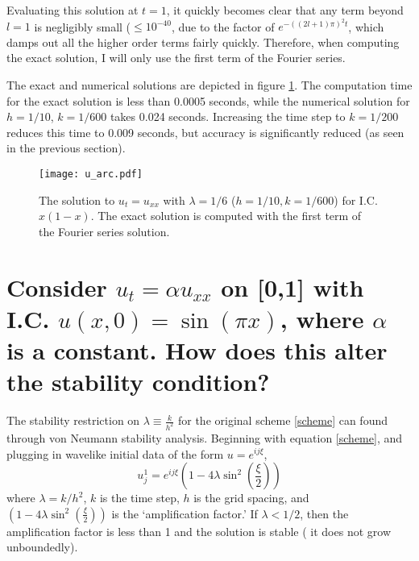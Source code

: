 \documentclass[11pt]{amsart}
\begin{document}
 Evaluating this solution at $t=1$, it quickly becomes clear that any term beyond $l=1$ is negligibly small ($\le 10^{-40}$, due to the factor of  $e^{-((2l+1)\pi)^2 t}$, which damps out all the higher order terms fairly quickly.  Therefore, when computing the exact solution, I will only use the first term of the Fourier series. 
 
 The exact and numerical solutions are depicted in figure \ref{uarc}.  The computation time for the exact solution is less than 0.0005 seconds, while the numerical solution for $h=1/10$, $k=1/600$ takes 0.024 seconds. Increasing the time step to $k=1/200$ reduces this time to 0.009 seconds, but accuracy is significantly reduced (as seen in the previous section). 
 \begin{figure}[t]
\begin{center} 
\texttt{[image: u\_arc.pdf]}
\caption{The solution to $u_t = u_{xx}$ with  $\lambda =1/6$ ($h=1/10 , k = 1/600$) for I.C. $x(1-x)$. The exact solution is computed with the first  term of the Fourier series solution.  }
\label{uarc} 
\end{center}
\end{figure}
 
\section{Consider $u_t = \alpha u_{xx}$ on [0,1] with I.C. $u(x,0)= \sin(\pi x)$, where $\alpha$ is a constant. How does this alter the stability condition? }
The stability restriction on $\lambda \equiv \frac{k}{h^2}$ for the original scheme \eqref{scheme} can found through von Neumann stability analysis. Beginning with equation \eqref{scheme}, and plugging in wavelike initial data of the form $u= e^{i j \xi}$,
\begin{equation} 
u_j^{1} = e^{i j \xi}(1-4\lambda \sin^2(\frac{\xi}{2}))
\end{equation}
where $\lambda = k/h^2$, $k$ is the time step, $h$ is the grid spacing, and $(1-4\lambda \sin^2(\frac{\xi}{2}))$ is the `amplification factor.'  
If $\lambda < 1/2$, then the amplification factor is less than 1 and the solution is stable ( it does not grow unboundedly). 

 
\end{document}
